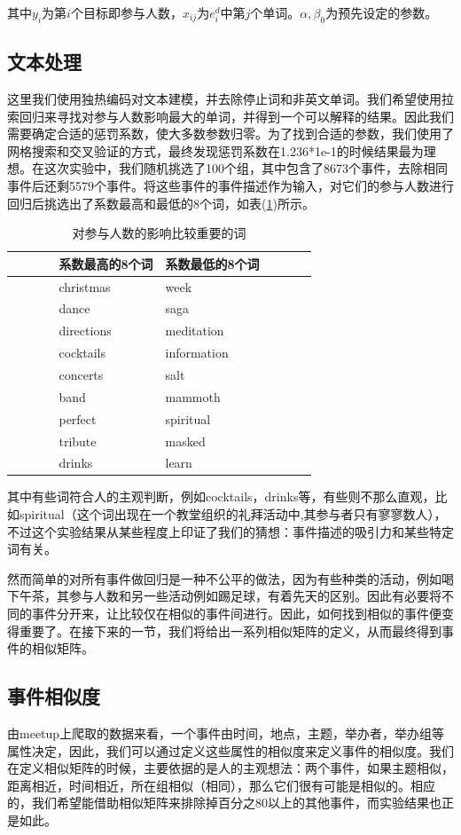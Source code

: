 \documentclass[12pt]{template}
\begin{document}
其中\(y_i\)为第\(i\)个目标即参与人数，\(x_{ij}\)为\(e_i^d\)中第\(j\)个单词。\(\alpha,\beta_0\)为预先设定的参数。
\subsection{文本处理}\label{3.2}
这里我们使用独热编码对文本建模，并去除停止词和非英文单词。我们希望使用拉索回归来寻找对参与人数影响最大的单词，并得到一个可以解释的结果。因此我们需要确定合适的惩罚系数，使大多数参数归零。为了找到合适的参数，我们使用了网格搜索和交叉验证的方式，最终发现惩罚系数在1.236*1e-1的时候结果最为理想。在这次实验中，我们随机挑选了100个组，其中包含了8673个事件，去除相同事件后还剩5579个事件。将这些事件的事件描述作为输入，对它们的参与人数进行回归后挑选出了系数最高和最低的8个词，如表(\ref{t1-2})所示。
\begin{table}[htbp]

\caption{\label{t1-2}对参与人数的影响比较重要的词}
  \centering
    \begin{tabular*}{\linewidth}{p{0.15\linewidth}p{0.35\linewidth}p{0.35\linewidth}p{0.15\linewidth}}
\toprule      
    &系数最高的8个词 & 系数最低的8个词&\tabularnewline
\midrule
&christmas & week&\tabularnewline
&dance & saga&\tabularnewline
&directions & meditation&\tabularnewline
&cocktails & information&\tabularnewline
&concerts & salt&\tabularnewline
&band & mammoth&\tabularnewline
&perfect & spiritual&\tabularnewline
&tribute & masked&\tabularnewline
&drinks & learn&\tabularnewline
\bottomrule
    \end{tabular*}
\end{table}

其中有些词符合人的主观判断，例如cocktails，drinks等，有些则不那么直观，比如spiritual（这个词出现在一个教堂组织的礼拜活动中,其参与者只有寥寥数人），不过这个实验结果从某些程度上印证了我们的猜想：事件描述的吸引力和某些特定词有关。

然而简单的对所有事件做回归是一种不公平的做法，因为有些种类的活动，例如喝下午茶，其参与人数和另一些活动例如踢足球，有着先天的区别。因此有必要将不同的事件分开来，让比较仅在相似的事件间进行。因此，如何找到相似的事件便变得重要了。在接下来的一节，我们将给出一系列相似矩阵的定义，从而最终得到事件的相似矩阵。
\subsection{事件相似度}\label{s1-4}
由meetup上爬取的数据来看，一个事件由时间，地点，主题，举办者，举办组等属性决定，因此，我们可以通过定义这些属性的相似度来定义事件的相似度。我们在定义相似矩阵的时候，主要依据的是人的主观想法：两个事件，如果主题相似，距离相近，时间相近，所在组相似（相同），那么它们很有可能是相似的。相应的，我们希望能借助相似矩阵来排除掉百分之80以上的其他事件，而实验结果也正是如此。
\end{document}
